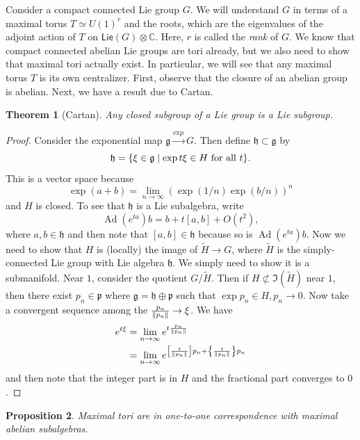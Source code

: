 \documentclass[leqno, openany]{memoir}
\newtheorem{thm}{Theorem}[section]
\newtheorem{prop}[thm]{Proposition}
\theoremstyle{definition}
\theoremstyle{remark}
\theoremstyle{plain}
\theoremstyle{definition}
\theoremstyle{remark}
\newcommand{\C}{\mathbb{C}}
\newcommand{\mf}[1]{\mathfrak{#1}}
\newcommand{\ms}[1]{\mathsf{#1}}
\newcommand{\wtl}[1]{\widetilde{#1}}
\DeclareMathOperator{\Ad}{Ad}
\begin{document}
Consider a compact connected Lie group $G$. We will understand $G$ in terms of a maximal torus $T \simeq {U(1)}^r$ and the roots, which are the eigenvalues of the adjoint action of $T$ on $\ms{Lie}(G) \otimes \C$. Here, $r$ is called the \textit{rank} of $G$. We know that compact connected abelian Lie groups are tori already, but we also need to show that maximal tori actually exist. In particular, we will see that any maximal torus $T$ is its own centralizer. First, observe that the closure of an abelian group is abelian. Next, we have a result due to Cartan.

\begin{thm}[Cartan]
    Any closed subgroup of a Lie group is a Lie subgroup.
\end{thm}

\begin{proof}
    Consider the exponential map $\mf{g} \xrightarrow{\exp} G$. Then define $\mf{h} \subset \mf{g}$ by
    \[ \mf{h} = \qty{ \xi \in \mf{g} \mid \exp t \xi \in H \text{~for all } t }. \]
    This is a vector space because
    \[ \exp(a+b) = \lim_{n \to \infty} {(\exp(1/n) \exp(b/n))}^n \]
    and $H$ is closed. To see that $\mf{h}$ is a Lie subalgebra, write 
    \[ \Ad(e^{t a}) b = b + t[a,b] + O(t^2), \]
    where $a,b \in \mf{h}$ and then note that $[a,b] \in \mf{h}$ because so is $\Ad(e^{ta})b$. Now we need to show that $H$ is (locally) the image of $\wtl{H} \to G$, where $\wtl{H}$ is the simply-connected Lie group with Lie algebra $\mf{h}$. We simply need to show it is a submanifold. Near $1$, consider the quotient $G / \wtl{H}$. Then if $H \not\subset \Im(\wtl{H})$ near $1$, then there exist $p_n \in \mf{p}$ where $\mf{g} = \mf{h} \oplus \mf{p}$ such that $\exp p_n \in H, p_n \to 0$. Now take a convergent sequence among the $\frac{p_n}{\norm{p_n}} \to \xi$. We have
    \begin{align*} 
        e^{t \xi} &= \lim_{n \to \infty} e^{t \frac{p_n}{\norm{p_n}}} \\
                  &= \lim_{n \to \infty} e^{\qty[\frac{t}{\norm{p_n}}] p_n + \qty{ \frac{t}{\norm{p_n}}} p_n }
    \end{align*}
    and then note that the integer part is in $H$ and the fractional part converges to $0$.
\end{proof}

\begin{prop}
    Maximal tori are in one-to-one correspondence with maximal abelian subalgebras.
\end{prop}
\end{document}
